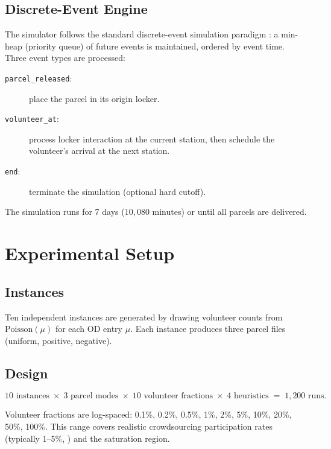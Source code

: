 \documentclass[11pt,a4paper]{article}
\begin{document}
\subsection{Discrete-Event Engine}

The simulator follows the standard discrete-event simulation paradigm
\cite{law2015simulation}: a min-heap (priority queue) of future events is
maintained, ordered by event time. Three event types are processed:
\begin{description}
  \item[\texttt{parcel\_released}:] place the parcel in its origin locker.
  \item[\texttt{volunteer\_at}:] process locker interaction at the current
        station, then schedule the volunteer's arrival at the next station.
  \item[\texttt{end}:] terminate the simulation (optional hard cutoff).
\end{description}
The simulation runs for 7 days ($10{,}080$ minutes) or until all parcels are
delivered.

\section{Experimental Setup}

\subsection{Instances}

Ten independent instances are generated by drawing volunteer counts from
$\mathrm{Poisson}(\mu)$ for each OD entry $\mu$. Each instance produces three
parcel files (uniform, positive, negative).

\subsection{Design}

\[
  10 \text{ instances} \;\times\; 3 \text{ parcel modes} \;\times\;
  10 \text{ volunteer fractions} \;\times\; 4 \text{ heuristics}
  \;=\; 1{,}200 \text{ runs}.
\]

Volunteer fractions are log-spaced: 0.1\%, 0.2\%, 0.5\%, 1\%, 2\%, 5\%, 10\%,
20\%, 50\%, 100\%. This range covers realistic crowdsourcing participation
rates (typically 1--5\%, \cite{archetti2016vrp,sampaio2019crowd}) and the
saturation region.
\end{document}
